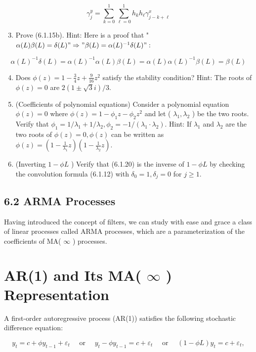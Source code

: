 \documentclass[10pt]{article}
\begin{document}
$$
\gamma_{j}^{y}=\sum_{k=0}^{1} \sum_{\ell=0}^{1} h_{k} h_{\ell} \gamma_{j-k+\ell}^{x}
$$

\begin{enumerate}
  \setcounter{enumi}{2}
  \item Prove (6.1.15b). Hint: Here is a proof that " $\alpha(L) \beta(L)=\delta(L) " \Rightarrow " \beta(L)= \alpha(L)^{-1} \delta(L) ":$
\end{enumerate}

$$
\alpha(L)^{-1} \delta(L)=\alpha(L)^{-1} \alpha(L) \beta(L)=\alpha(L) \alpha(L)^{-1} \beta(L)=\beta(L)
$$

\begin{enumerate}
  \setcounter{enumi}{3}
  \item Does $\phi(z)=1-\frac{3}{4} z+\frac{9}{16} z^{2}$ satisfy the stability condition? Hint: The roots of $\phi(z)=0$ are $2(1 \pm \sqrt{3} i) / 3$.
  \item (Coefficients of polynomial equations) Consider a polynomial equation $\phi(z)=0$ where $\phi(z)=1-\phi_{1} z-\phi_{2} z^{2}$ and let ( $\lambda_{1}, \lambda_{2}$ ) be the two roots. Verify that $\phi_{1}=1 / \lambda_{1}+1 / \lambda_{2}, \phi_{2}=-1 /\left(\lambda_{1} \cdot \lambda_{2}\right)$. Hint: If $\lambda_{1}$ and $\lambda_{2}$ are the two roots of $\phi(z)=0, \phi(z)$ can be written as $\phi(z)=\left(1-\frac{1}{\lambda_{1}} z\right)\left(1-\frac{1}{\lambda_{2}} z\right)$.
  \item (Inverting $1-\phi L$ ) Verify that (6.1.20) is the inverse of $1-\phi L$ by checking the convolution formula (6.1.12) with $\delta_{0}=1, \delta_{j}=0$ for $j \geq 1$.
\end{enumerate}

\subsection*{6.2 ARMA Processes}
Having introduced the concept of filters, we can study with ease and grace a class of linear processes called ARMA processes, which are a parameterization of the coefficients of MA( $\infty$ ) processes.

\section*{AR(1) and Its MA( $\infty$ ) Representation}
A first-order autoregressive process (AR(1)) satisfies the following stochastic difference equation:


\begin{equation*}
y_{t}=c+\phi y_{t-1}+\varepsilon_{t} \quad \text { or } \quad y_{t}-\phi y_{t-1}=c+\varepsilon_{t} \quad \text { or } \quad(1-\phi L) y_{t}=c+\varepsilon_{t}, \tag{6.2.1}
\end{equation*}
\end{document}
